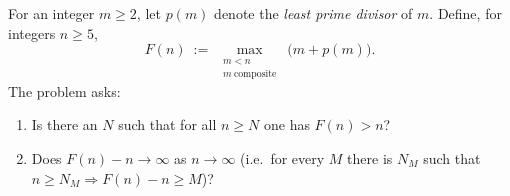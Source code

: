 For an integer $m\ge 2$, let $p(m)$ denote the \emph{least prime divisor} of $m$.
Define, for integers $n\ge 5$,
\[
F(n)\ :=\ \max_{\substack{m<n\\ m\ \text{composite}}}\ \bigl(m+p(m)\bigr).
\]
The problem asks:

\begin{enumerate}[label=(\alph*)]
\item Is there an $N$ such that for all $n\ge N$ one has $F(n)>n$?
\item Does $F(n)-n\to\infty$ as $n\to\infty$ (i.e.\ for every $M$ there is $N_M$ such that $n\ge N_M\Rightarrow F(n)-n\ge M$)?
\end{enumerate}

